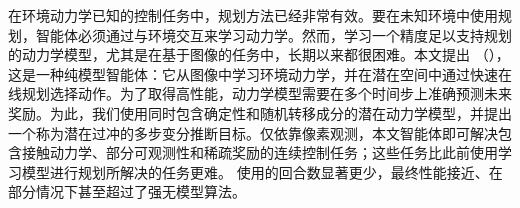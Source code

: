 在环境动力学已知的控制任务中，规划方法已经非常有效。要在未知环境中使用规划，智能体必须通过与环境交互来学习动力学。然而，学习一个精度足以支持规划的动力学模型，尤其是在基于图像的任务中，长期以来都很困难。本文提出 \fullmethod（\method{}），这是一种纯模型智能体：它从图像中学习环境动力学，并在潜在空间中通过快速在线规划选择动作。为了取得高性能，动力学模型需要在多个时间步上准确预测未来奖励。为此，我们使用同时包含确定性和随机转移成分的潜在动力学模型，并提出一个称为潜在过冲的多步变分推断目标。仅依靠像素观测，本文智能体即可解决包含接触动力学、部分可观测性和稀疏奖励的连续控制任务；这些任务比此前使用学习模型进行规划所解决的任务更难。\method{} 使用的回合数显著更少，最终性能接近、在部分情况下甚至超过了强无模型算法。
